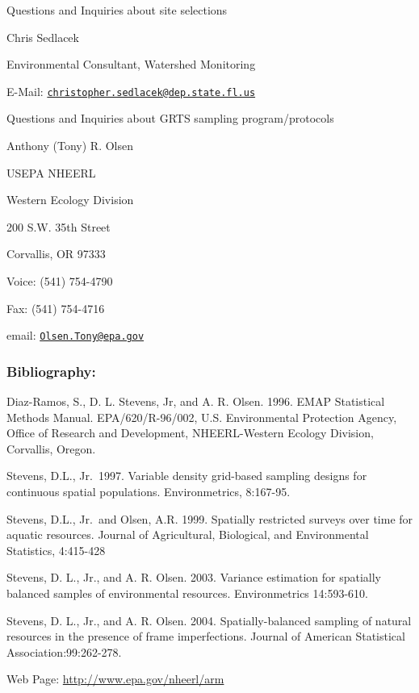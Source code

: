 \documentclass[
]{article}
\begin{document}
Questions and Inquiries about site selections

Chris Sedlacek

Environmental Consultant, Watershed Monitoring

E-Mail:
\href{mailto:christopher.sedlacek@dep.state.fl.us}{\nolinkurl{christopher.sedlacek@dep.state.fl.us}}

Questions and Inquiries about GRTS sampling program/protocols

Anthony (Tony) R. Olsen

USEPA NHEERL

Western Ecology Division

200 S.W. 35th Street

Corvallis, OR 97333

Voice: (541) 754-4790

Fax: (541) 754-4716

email: \href{mailto:Olsen.Tony@epa.gov}{\nolinkurl{Olsen.Tony@epa.gov}}

\hypertarget{bibliography}{%
\subsubsection{\texorpdfstring{\textbf{Bibliography:}}{Bibliography:}}\label{bibliography}}

Diaz-Ramos, S., D. L. Stevens, Jr, and A. R. Olsen. 1996. EMAP
Statistical Methods Manual. EPA/620/R-96/002, U.S. Environmental
Protection Agency, Office of Research and Development, NHEERL-Western
Ecology Division, Corvallis, Oregon.

Stevens, D.L., Jr.~1997. Variable density grid-based sampling designs
for continuous spatial populations. Environmetrics, 8:167-95.

Stevens, D.L., Jr.~and Olsen, A.R. 1999. Spatially restricted surveys
over time for aquatic resources. Journal of Agricultural, Biological,
and Environmental Statistics, 4:415-428

Stevens, D. L., Jr., and A. R. Olsen. 2003. Variance estimation for
spatially balanced samples of environmental resources. Environmetrics
14:593-610.

Stevens, D. L., Jr., and A. R. Olsen. 2004. Spatially-balanced sampling
of natural resources in the presence of frame imperfections. Journal of
American Statistical Association:99:262-278.

Web Page: \url{http://www.epa.gov/nheerl/arm}
\end{document}
